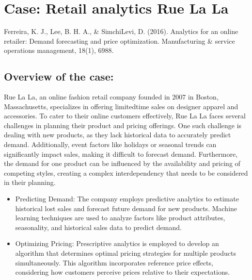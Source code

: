\documentclass[letterpaper,10pt,english]{jupyterBook}
\begin{document}
\sphinxstepscope


\chapter{Case: Retail analytics \sphinxhyphen{} Rue La La}
\label{\detokenize{docs/Case1_retails_intro:case-retail-analytics-rue-la-la}}\label{\detokenize{docs/Case1_retails_intro::doc}}
\sphinxAtStartPar
{}
Ferreira, K. J., Lee, B. H. A., \& Simchi\sphinxhyphen{}Levi, D. (2016). Analytics for an online retailer: Demand forecasting and price optimization. Manufacturing \& service operations management, 18(1), 69\sphinxhyphen{}88.


\section{Overview of the case:}
\label{\detokenize{docs/Case1_retails_intro:overview-of-the-case}}
\sphinxAtStartPar
Rue La La, an online fashion retail company founded in 2007 in Boston, Massachusetts, specializes in offering limited\sphinxhyphen{}time sales on designer apparel and accessories. To cater to their online customers effectively, Rue La La faces several challenges in planning their product and pricing offerings. One such challenge is dealing with new products, as they lack historical data to accurately predict demand. Additionally, event factors like holidays or seasonal trends can significantly impact sales, making it difficult to forecast demand. Furthermore, the demand for one product can be influenced by the availability and pricing of competing styles, creating a complex interdependency that needs to be considered in their planning.

\sphinxAtStartPar
{}
\begin{itemize}
\item {} 
\sphinxAtStartPar
Predicting Demand: The company employs predictive analytics to estimate historical lost sales and forecast future demand for new products. Machine learning techniques are used to analyze factors like product attributes, seasonality, and historical sales data to predict demand.

\item {} 
\sphinxAtStartPar
Optimizing Pricing: Prescriptive analytics is employed to develop an algorithm that determines optimal pricing strategies for multiple products simultaneously. This algorithm incorporates reference price effects, considering how customers perceive prices relative to their expectations.

\end{itemize}
\end{document}
